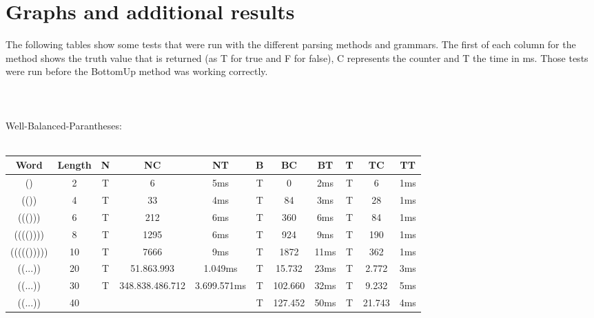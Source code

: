 \documentclass[a4paper, 11pt]{article}
\begin{document}







\newpage
\section{Graphs and additional results}
\label{previousresults}


The following tables show some tests that were run with the different parsing methods and grammars. The first of each column for the method shows the truth value that is returned (as T for true and F for false), C represents the counter and T the time in ms. Those tests were run before the BottomUp method was working correctly.
\\
\\
\\
\\
Well-Balanced-Parantheses: \\
\\
\begin{small}
\begin{tabular}{|c|c||c|c|c||c|c|c||c|c|c|}
\hline
Word & Length & N & NC & NT & B & BC & BT & T & TC & TT \\
\hline
\hline
() & 2 & T & 6 & 5ms & T & 0 & 2ms & T & 6 & 1ms \\
\hline
(()) & 4 & T & 33 & 4ms & T & 84 & 3ms & T & 28 & 1ms \\
\hline
((())) & 6 & T & 212 & 6ms & T & 360 & 6ms & T & 84 & 1ms \\
\hline
(((()))) & 8 & T & 1295 & 6ms & T & 924 & 9ms & T & 190 & 1ms \\
\hline
((((())))) & 10 & T & 7666 & 9ms & T & 1872 & 11ms & T & 362 & 1ms \\
\hline
((...)) & 20 & T & 51.863.993 & 1.049ms & T & 15.732 & 23ms & T & 2.772 & 3ms \\
\hline
((...)) & 30 & T & 348.838.486.712 & 3.699.571ms & T & 102.660 & 32ms & T & 9.232 & 5ms \\
\hline
((...)) & 40 & & & & T & 127.452 & 50ms & T & 21.743 & 4ms \\
\hline
\end{tabular}
\end{small}
\end{document}
